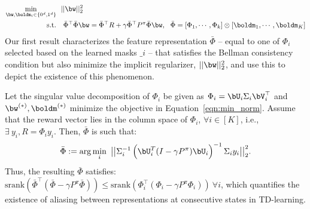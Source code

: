 \begin{align}
    \min_{\bw, \boldm_i \in \{0^d, 1^d \}}~~& ||\bw||_2^2 \nonumber\\
    \text{s.t.}~~&~ \bar{\Phi}^\top \bar{\Phi} \bw = \bar{\Phi}^\top R + \gamma \bar{\Phi}^\top P^\pi \bar{\Phi} \bw, ~~ \bar{\Phi} = \left[\Phi_1, \cdots, \Phi_k\right] \otimes [\boldm_1, \cdots, \boldm_K]
\label{eqn:min_norm}
\end{align}
Our first result characterizes the feature representation $\bar{\Phi}$ -- equal to one of $\Phi_i$ selected based on the learned masks $\bm_i$ -- that satisfies the Bellman consistency condition but also minimize the implicit regularizer, $||\bw||_2^2$,
and use this to depict the existence of this phenomenon.

\begin{theorem}
\label{thm:aliasing_exists}
Let the singular value decomposition of $\Phi_i$ be given as $\Phi_i = \bU_i \Sigma_i \bV_i^\top$ and $\bw^{(*)}, \boldm^{(*)}$ minimize the objective in Equation~\ref{eqn:min_norm}. Assume that the reward vector lies in the column space of $\Phi_i$, $\forall i \in [K]$, i.e., $\exists~ y_i, R = \Phi_i y_i $.  Then, $\bar{\Phi}$ is such that:
\begin{equation*}
    \bar{\Phi} := \arg \min_{i}~ \big|\big| \Sigma_i^{-1} \left( \bU_i^T (I - \gamma P^\pi) \bU_i \right)^{-1} \Sigma_i y_i\big|\big|_2^2.
\end{equation*}
Thus, the resulting $\bar{\Phi}$ satisfies: $\mathrm{srank}\left(\bar{\Phi}^\top (\bar{\Phi} - \gamma P^\pi \bar{\Phi}) \right) \leq \mathrm{srank}\left(\Phi_i^\top (\Phi_i - \gamma P^\pi \Phi_i) \right)~ \forall i$, which quantifies the existence of aliasing between representations at consecutive states in TD-learning.
\end{theorem}


